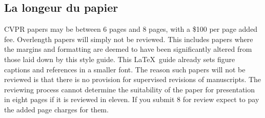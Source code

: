 \documentclass[10pt,twocolumn,letterpaper]{article}
\begin{document}
\subsection{La longeur du papier}
CVPR papers may be between 6 pages and 8 pages, with a \$100 per page added
fee.  Overlength papers will simply not be reviewed.  This includes papers
where the margins and formatting are deemed to have been significantly
altered from those laid down by this style guide.  This
\LaTeX\ guide already sets figure captions and references in a smaller font.
The reason such papers will not be reviewed is that there is no provision for
supervised revisions of manuscripts.  The reviewing process cannot determine
the suitability of the paper for presentation in eight pages if it is
reviewed in eleven.  If you submit 8 for review expect to pay the added page
charges for them. 
\end{document}
